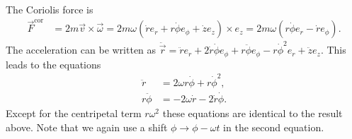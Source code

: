 \documentclass[english, parskip=full]{scrartcl}
\newcommand{\kla}{}
\newcommand{\tecxt}{}
\begin{document}
The Coriolis force is 
\begin{align}
\vec{F}^\tecxt\text{cor} &= 2m\vec{v} \times \vec{\omega} = 2m\omega \kla\left( \dot{r}e_r + r\dot{\phi}e_\phi + \dot{z}e_z \right) \times e_z = 2m\omega \kla\left( r\dot{\phi} e_r - \dot{r}e_\phi \right).
\end{align}
The acceleration can be written as $\ddot{\vec{r}} = \ddot{r}e_r + 2\dot{r} \dot{\phi} e_\phi + r\ddot{\phi} e_\phi - r\dot{\phi}^2 e_r + \ddot{z}e_z$.
This leads to the equations
\begin{align}
\ddot{r} &= 2\omega r\dot{\phi} + r\dot{\phi}^2,\\
r\ddot{\phi} &= -2\omega \dot{r} - 2\dot{r} \dot{\phi}.
\end{align}
Except for the centripetal term $r\omega^2$ these equations are identical to the result above.
Note that we again use a shift $\phi \rightarrow \phi - \omega t$ in the second equation.
\end{document}

